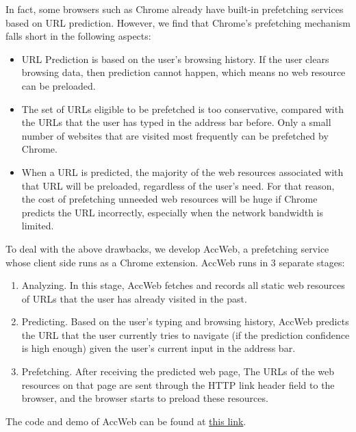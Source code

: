 In fact, some browsers such as Chrome already have built-in prefetching services based on URL prediction. However, we find that Chrome's prefetching mechanism falls short in the following aspects:
\begin{itemize}
	\item URL Prediction is based on the user's browsing history. If the user clears browsing data, then prediction cannot happen, which means no web resource can be preloaded.
	\item The set of URLs eligible to be prefetched is too conservative, compared with the URLs that the user has typed in the address bar before. Only a small number of websites that are visited most frequently can be prefetched by Chrome.
	\item When a URL is predicted, the majority of the web resources associated with that URL will be preloaded, regardless of the user's need. For that reason, the cost of prefetching unneeded web resources will be huge if Chrome predicts the URL incorrectly, especially when the network bandwidth is limited.
\end{itemize}

To deal with the above drawbacks, we develop AccWeb, a prefetching service whose client side runs as a Chrome extension. AccWeb runs in 3 separate stages:
\begin{enumerate}
	\item Analyzing. In this stage, AccWeb fetches and records all static web resources of URLs that the user has already visited in the past.
	\item Predicting. Based on the user's typing and browsing history, AccWeb predicts the URL that the user currently tries to navigate (if the prediction confidence is high enough) given the user's current input in the address bar.
	\item Prefetching. After receiving the predicted web page, The URLs of the web resources on that page are sent through the HTTP link header field to the browser, and the browser starts to preload these resources.
\end{enumerate}
The code and demo of AccWeb can be found at \href{https://github.com/caiqizhe/COS561_final_project}{this link}.

